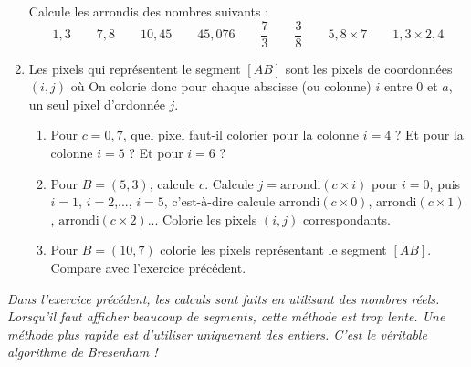 \documentclass[class=report,crop=false, 12pt]{standalone}
\begin{document}
\begin{activite}
\begin{enumerate}

    
    Calcule les arrondis des nombres suivants :
    $$1,3 \qquad 7,8 \qquad 10,45 \qquad 45,076 \qquad \frac{7}{3} \qquad \frac{3}{8} \qquad 5,8 \times 7
\qquad 1,3 \times 2,4$$


   \item Les pixels qui représentent le segment $[AB]$ sont les pixels de coordonnées $(i,j)$ où
   On colorie donc pour chaque abscisse (ou colonne) $i$ entre $0$ et $a$, un seul pixel d'ordonnée $j$.
   
   \begin{enumerate}
     \item Pour $c = 0,7$, quel pixel faut-il colorier pour la colonne $i=4$ ? Et pour la colonne $i=5$ ? Et pour $i=6$ ?
     \item Pour $B=(5,3)$, calcule $c$. Calcule $j=\text{arrondi}(c\times i)$ pour $i=0$, puis $i=1$, $i=2$,..., $i=5$, c'est-à-dire calcule $\text{arrondi}(c\times 0)$, $\text{arrondi}(c\times 1)$, $\text{arrondi}(c\times 2)$... Colorie les pixels $(i,j)$ correspondants.
     
     \item Pour $B=(10,7)$ colorie les pixels représentant le segment $[AB]$. Compare avec l'exercice précédent.
   \end{enumerate}   
\end{enumerate}

\end{activite}

\bigskip

\emph{Dans l'exercice précédent, les calculs sont faits en utilisant des nombres réels. Lorsqu'il faut afficher beaucoup de segments, cette méthode est trop lente. Une méthode plus rapide est d'utiliser uniquement des entiers. C'est le véritable algorithme de Bresenham !}

\bigskip
\end{document}
